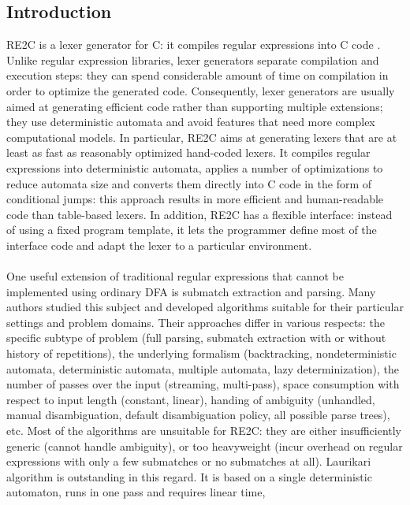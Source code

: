 \documentclass{article}
\theoremstyle{definition}
\begin{document}
\begin{multicols}{2}

\section*{Introduction}

RE2C is a lexer generator for C: it compiles regular expressions into C code \cite{BC93} \cite{RE2C}.
Unlike regular expression libraries, lexer generators separate compilation and execution steps:
they can spend considerable amount of time on compilation in order to optimize the generated code.
Consequently, lexer generators are usually aimed at generating efficient code rather than supporting multiple extensions;
they use deterministic automata and avoid features that need more complex computational models.
In particular, RE2C aims at generating lexers that are at least as fast as reasonably optimized hand-coded lexers.
It compiles regular expressions into deterministic automata,
applies a number of optimizations to reduce automata size
and converts them directly into C code in the form of conditional jumps:
this approach results in more efficient and human-readable code than table-based lexers.
In addition, RE2C has a flexible interface:
instead of using a fixed program template,
it lets the programmer define most of the interface code
and adapt the lexer to a particular environment.
\\ \\
One useful extension of traditional regular expressions that cannot be implemented using ordinary DFA is submatch extraction and parsing.
Many authors studied this subject and developed algorithms suitable for their particular settings and problem domains.
Their approaches differ in various respects:
the specific subtype of problem (full parsing, submatch extraction with or without history of repetitions),
the underlying formalism (backtracking,
nondeterministic automata, deterministic automata, 
multiple automata, lazy determinization),
the number of passes over the input (streaming, multi-pass),
space consumption with respect to input length (constant, linear),
handing of ambiguity (unhandled, manual disambiguation, default disambiguation policy, all possible parse trees), etc.
Most of the algorithms are unsuitable for RE2C: they are either insufficiently generic (cannot handle ambiguity),
or too heavyweight (incur overhead on regular expressions with only a few submatches or no submatches at all).
Laurikari algorithm is outstanding in this regard.
It is based on a single deterministic automaton, runs in one pass and requires linear time,

\end{multicols}
\end{document}
